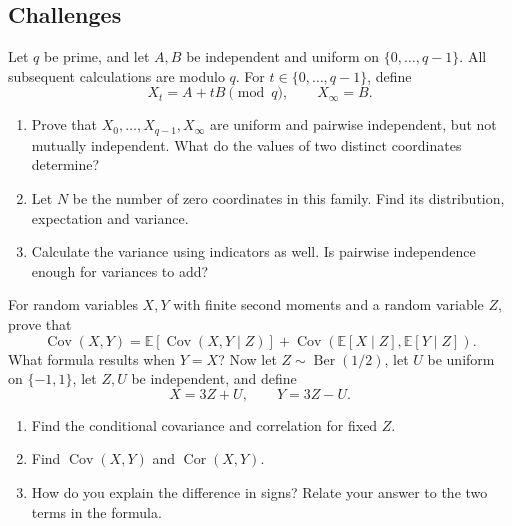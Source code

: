 \documentclass[11pt,a4paper]{article}
\newenvironment{enumeratea}{\begin{enumerate}[label=(\alph*),itemsep=0.28em,topsep=0.25em]}{\end{enumerate}}
\newcommand{\Ebb}{\mathbb E}
\newcommand{\Cov}{\operatorname{Cov}}
\newcommand{\Cor}{\operatorname{Cor}}
\newcommand{\Ber}{\operatorname{Ber}}
\newcounter{problem}[section]
\begin{document}
\subsection*{Challenges}
\begin{problemstar}
Let $q$ be prime, and let $A,B$ be independent and uniform on $\{0,\ldots,q-1\}$.
All subsequent calculations are modulo $q$. For $t\in\{0,\ldots,q-1\}$, define
\[ X_t=A+tB\pmod q,\qquad X_\infty=B. \]
\begin{enumeratea}
  \item Prove that $X_0,\ldots,X_{q-1},X_\infty$ are uniform and pairwise
  independent, but not mutually independent. What do the values of two distinct coordinates determine?
  \item Let $N$ be the number of zero coordinates in this family.
  Find its distribution, expectation and variance.
  \item Calculate the variance using indicators as well. Is pairwise independence
  enough for variances to add?
\end{enumeratea}
\end{problemstar}
\begin{problemstar}
For random variables $X,Y$ with finite second moments and a random variable $Z$, prove that
\[
\Cov(X,Y)=\Ebb\!\left[\Cov(X,Y\mid Z)\right]
+\Cov\!\left(\Ebb[X\mid Z],\Ebb[Y\mid Z]\right).
\]
What formula results when $Y=X$? Now let $Z\sim\Ber(1/2)$, let $U$ be uniform
on $\{-1,1\}$, let $Z,U$ be independent, and define
\[ X=3Z+U,\qquad Y=3Z-U. \]
\begin{enumeratea}
  \item Find the conditional covariance and correlation for fixed $Z$.
  \item Find $\Cov(X,Y)$ and $\Cor(X,Y)$.
  \item How do you explain the difference in signs? Relate your answer to the two terms in the formula.
\end{enumeratea}
\end{problemstar}
\end{document}
